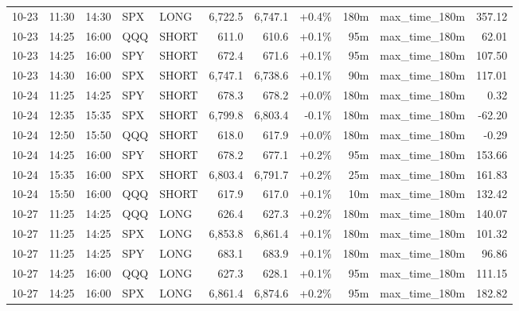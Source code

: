 \documentclass[11pt,a4paper,twoside]{article}
\begin{document}
\begin{center}
\begin{longtable}{>{\color{txtmain}}l l l l l r r r r >{\color{txtmain}}l r}
10-23 & 11:30 & 14:30 & SPX & LONG & 6,722.5 & 6,747.1 & \textcolor{wingreen}{+0.4\%} & 180m & max\_time\_180m & \textcolor{wingreen}{357.12} \\
10-23 & 14:25 & 16:00 & QQQ & SHORT & 611.0 & 610.6 & \textcolor{wingreen}{+0.1\%} & 95m & max\_time\_180m & \textcolor{wingreen}{62.01} \\
10-23 & 14:25 & 16:00 & SPY & SHORT & 672.4 & 671.6 & \textcolor{wingreen}{+0.1\%} & 95m & max\_time\_180m & \textcolor{wingreen}{107.50} \\
10-23 & 14:30 & 16:00 & SPX & SHORT & 6,747.1 & 6,738.6 & \textcolor{wingreen}{+0.1\%} & 90m & max\_time\_180m & \textcolor{wingreen}{117.01} \\
10-24 & 11:25 & 14:25 & SPY & SHORT & 678.3 & 678.2 & \textcolor{wingreen}{+0.0\%} & 180m & max\_time\_180m & \textcolor{wingreen}{0.32} \\
10-24 & 12:35 & 15:35 & SPX & SHORT & 6,799.8 & 6,803.4 & \textcolor{lossred}{-0.1\%} & 180m & max\_time\_180m & \textcolor{lossred}{-62.20} \\
10-24 & 12:50 & 15:50 & QQQ & SHORT & 618.0 & 617.9 & \textcolor{wingreen}{+0.0\%} & 180m & max\_time\_180m & \textcolor{lossred}{-0.29} \\
10-24 & 14:25 & 16:00 & SPY & SHORT & 678.2 & 677.1 & \textcolor{wingreen}{+0.2\%} & 95m & max\_time\_180m & \textcolor{wingreen}{153.66} \\
10-24 & 15:35 & 16:00 & SPX & SHORT & 6,803.4 & 6,791.7 & \textcolor{wingreen}{+0.2\%} & 25m & max\_time\_180m & \textcolor{wingreen}{161.83} \\
10-24 & 15:50 & 16:00 & QQQ & SHORT & 617.9 & 617.0 & \textcolor{wingreen}{+0.1\%} & 10m & max\_time\_180m & \textcolor{wingreen}{132.42} \\
10-27 & 11:25 & 14:25 & QQQ & LONG & 626.4 & 627.3 & \textcolor{wingreen}{+0.2\%} & 180m & max\_time\_180m & \textcolor{wingreen}{140.07} \\
10-27 & 11:25 & 14:25 & SPX & LONG & 6,853.8 & 6,861.4 & \textcolor{wingreen}{+0.1\%} & 180m & max\_time\_180m & \textcolor{wingreen}{101.32} \\
10-27 & 11:25 & 14:25 & SPY & LONG & 683.1 & 683.9 & \textcolor{wingreen}{+0.1\%} & 180m & max\_time\_180m & \textcolor{wingreen}{96.86} \\
10-27 & 14:25 & 16:00 & QQQ & LONG & 627.3 & 628.1 & \textcolor{wingreen}{+0.1\%} & 95m & max\_time\_180m & \textcolor{wingreen}{111.15} \\
10-27 & 14:25 & 16:00 & SPX & LONG & 6,861.4 & 6,874.6 & \textcolor{wingreen}{+0.2\%} & 95m & max\_time\_180m & \textcolor{wingreen}{182.82} \\

\end{longtable}
\end{center}
\end{document}
